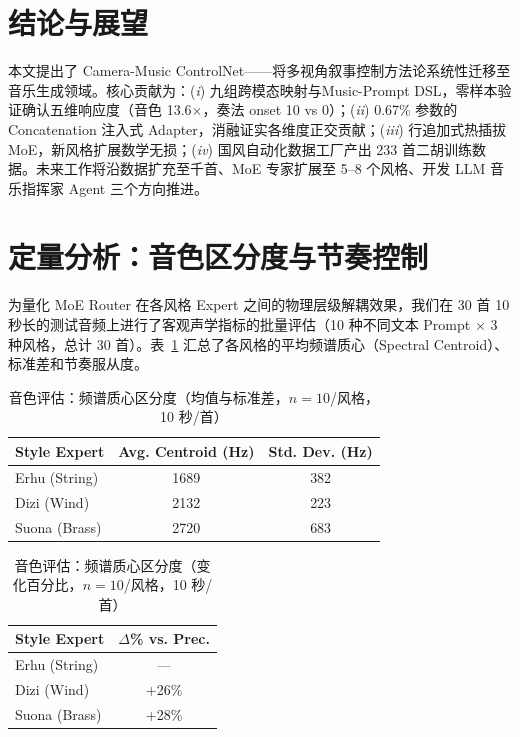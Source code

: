\documentclass[conference]{IEEEtran}
\begin{document}
\section{结论与展望}

本文提出了 Camera-Music ControlNet——将多视角叙事控制方法论系统性迁移至音乐生成领域。核心贡献为：(\textit{i}) 九组跨模态映射与Music-Prompt DSL，零样本验证确认五维响应度（音色 13.6$\times$，奏法 onset 10 vs 0）；(\textit{ii}) 0.67\% 参数的 Concatenation 注入式 Adapter，消融证实各维度正交贡献；(\textit{iii}) 行追加式热插拔 MoE，新风格扩展数学无损；(\textit{iv}) 国风自动化数据工厂产出 233 首二胡训练数据。未来工作将沿数据扩充至千首、MoE 专家扩展至 5--8 个风格、开发 LLM 音乐指挥家 Agent 三个方向推进。

\appendices
\section{定量分析：音色区分度与节奏控制}

为量化 MoE Router 在各风格 Expert 之间的物理层级解耦效果，我们在 30 首 10 秒长的测试音频上进行了客观声学指标的批量评估（10 种不同文本 Prompt $\times$ 3 种风格，总计 30 首）。表~\ref{tab:timbre_eval} 汇总了各风格的平均频谱质心（Spectral Centroid）、标准差和节奏服从度。

\begin{table}[htbp]
\centering\footnotesize
\caption{音色评估：频谱质心区分度（均值与标准差，$n=10$/风格，10 秒/首）}
\label{tab:timbre_eval}
\begin{tabular}{@{}lcc@{}}
\toprule
\textbf{Style Expert} & \textbf{Avg. Centroid (Hz)} & \textbf{Std. Dev. (Hz)} \\
\midrule
Erhu (String)  & 1689 & 382 \\
Dizi (Wind)    & 2132 & 223 \\
Suona (Brass)  & 2720 & 683 \\
\bottomrule
\end{tabular}
\end{table}

\begin{table}[htbp]
\centering\footnotesize
\caption{音色评估：频谱质心区分度（变化百分比，$n=10$/风格，10 秒/首）}
\label{tab:timbre_eval_delta} 
\begin{tabular}{@{}lc@{}}
\toprule
\textbf{Style Expert} & \textbf{$\Delta$\% vs. Prec.} \\
\midrule
Erhu (String)  & ---   \\
Dizi (Wind)    & +26\%  \\
Suona (Brass)  & +28\%  \\
\bottomrule
\end{tabular}
\end{table}
\end{document}

